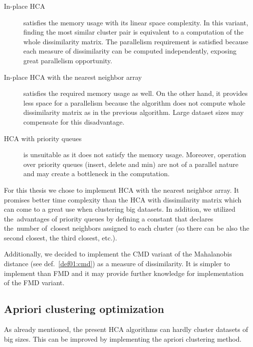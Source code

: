 \begin{description}

\item[In-place HCA] satisfies the memory usage with its linear space complexity. In this variant, finding the most similar cluster pair is equivalent to a computation of the whole dissimilarity matrix. The parallelism requirement is satisfied because each measure of dissimilarity can be computed independently, exposing great parallelism opportunity. 

\item[In-place HCA with the nearest neighbor array] satisfies the required memory usage as well. On the other hand, it provides less space for a parallelism because the algorithm does not compute whole dissimilarity matrix as in the previous algorithm. Large dataset sizes may compensate for this disadvantage. 

\item[HCA with priority queues] is unsuitable as it does not satisfy the memory usage. Moreover, operation over priority queues (insert, delete and min) are not of a parallel nature and may create a bottleneck in the computation.

\end{description}

For this thesis we chose to implement HCA with the nearest neighbor array. It promises better time complexity than the HCA with dissimilarity matrix which can come to a great use when clustering big datasets. In addition, we utilized the~advantages of priority queues by defining a constant that declares the~number of~closest neighbors assigned to each cluster (so there can be also the second closest, the third closest, etc.).

Additionally, we decided to implement the CMD variant of the Mahalanobis distance (see def.~\ref{def01:cmd}) as a measure of dissimilarity. It is simpler to implement than FMD and it may provide further knowledge for implementation of the FMD variant.

\subsection{Apriori clustering optimization}

As already mentioned, the present HCA algorithms can hardly cluster datasets of big sizes. This can be improved by implementing the apriori clustering method.

